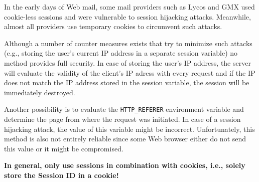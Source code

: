 \documentclass[a4paper, justified, notoc]{tufte-handout} %
\makeatletter
\newenvironment{listing}[1][htbp]
  {\ifvmode\else\unskip\fi\begin{@tufte@float}[#1]{lstlisting}{}}
  {\end{@tufte@float} } %
\makeatother
\begin{document}
In the early days of Web mail, some mail providers such as Lycos and GMX used cookie-less sessions and were vulnerable to session hijacking attacks. Meanwhile, almost all providers use temporary cookies to circumvent such attacks. 

Although a number of counter measures exists that try to minimize such attacks (e.g., storing the user's current IP address in a separate session variable) no method provides full security. In case of storing the user's IP address, the server will evaluate the validity of the client's IP adress with every request and if the IP does not match the IP address stored in the session variable, the session will be immediately destroyed. 

Another possibility is to evaluate the \texttt{HTTP\_REFERER} environment variable and determine the page from where the request was initiated. In case of a session hijacking attack, the value of this variable might be incorrect. Unfortunately, this method is also not entirely reliable since some Web browser either do not send this value or it might be compromised.  

\textbf{In general, only use sessions in combination with cookies, i.e., solely store the Session ID in a cookie!}







%






\end{document}
